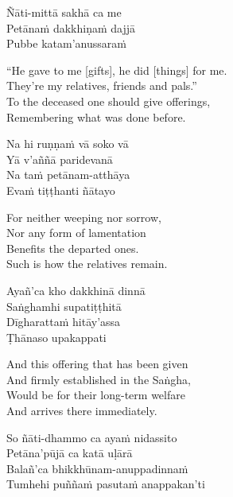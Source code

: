 \vspace{-0.99em}

\begin{pali-hang}
  Ñāti-mittā sakhā ca me\\
  Petānaṁ dakkhiṇaṁ dajjā\\
  Pubbe katam'anussaraṁ
\end{pali-hang}

\begin{english-verses}
  ``He gave to me [gifts], he did [things] for me.\\
  They're my relatives, friends and pals.''\\
  To the deceased one should give offerings,\\
  Remembering what was done before.
\end{english-verses}

\begin{pali-hang-continued}
  Na hi ruṇṇaṁ vā soko vā\\
  Yā v'aññā paridevanā\\
  Na taṁ petānam-atthāya\\
  Evaṁ tiṭṭhanti ñātayo
\end{pali-hang-continued}

\begin{english-verses}
  For neither weeping nor sorrow,\\
  Nor any form of lamentation\\
  Benefits the departed ones.\\
  Such is how the relatives remain.
\end{english-verses}

\begin{pali-hang-continued}
  Ayañ'ca kho dakkhinā dinnā\\
  Saṅghamhi supatiṭṭhitā\\
  Dīgharattaṁ hitāy'assa\\
  Ṭhānaso upakappati
\end{pali-hang-continued}

\begin{english-verses}
  And this offering that has been given\\
  And firmly established in the Saṅgha,\\
  Would be for their long-term welfare\\
  And arrives there immediately.
\end{english-verses}

\begin{pali-hang-continued}
  So ñāti-dhammo ca ayaṁ nidassito\\
  Petāna'pūjā ca katā uḷārā\\
  Balañ'ca bhikkhūnam-anuppadinnaṁ\\
  Tumhehi puññaṁ pasutaṁ anappakan'ti
\end{pali-hang-continued}

